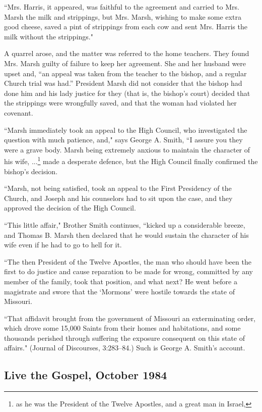 ``Mrs. Harris, it appeared, was faithful to the agreement and carried to Mrs. Marsh the milk and strippings, but Mrs. Marsh, wishing to make some extra good cheese, saved a pint of strippings from each cow and sent Mrs. Harris the milk without the strippings."

A quarrel arose, and the matter was referred to the home teachers. They found Mrs. Marsh guilty of failure to keep her agreement. She and her husband were upset and, ``an appeal was taken from the teacher to the bishop, and a regular Church trial was had.” President Marsh did not consider that the bishop had done him and his lady justice for they (that is, the bishop’s court) decided that the strippings were wrongfully saved, and that the woman had violated her covenant.

``Marsh immediately took an appeal to the High Council, who investigated the question with much patience, and," says George A. Smith, “I assure you they were a grave body. Marsh being extremely anxious to maintain the character of his wife, ...\footnote{as he was the President of the Twelve Apostles, and a great man in Israel,} made a desperate defence, but the High Council finally confirmed the bishop's decision.

``Marsh, not being satisfied, took an appeal to the First Presidency of the Church, and Joseph and his counselors had to sit upon the case, and they approved the decision of the High Council.

``This little affair," Brother Smith continues, ``kicked up a considerable breeze, and Thomas B. Marsh then declared that he would sustain the character of his wife even if he had to go to hell for it.

``The then President of the Twelve Apostles, the man who should have been the first to do justice and cause reparation to be made for wrong, committed by any member of the family, took that position, and what next? He went before a magistrate and swore that the ‘Mormons’ were hostile towards the state of Missouri.

``That affidavit brought from the government of Missouri an exterminating order, which drove some 15,000 Saints from their homes and habitations, and some thousands perished through suffering the exposure consequent on this state of affairs." (Journal of Discourses, 3:283–84.) Such is George A. Smith’s account.

\subsection{Live the Gospel, October 1984}

